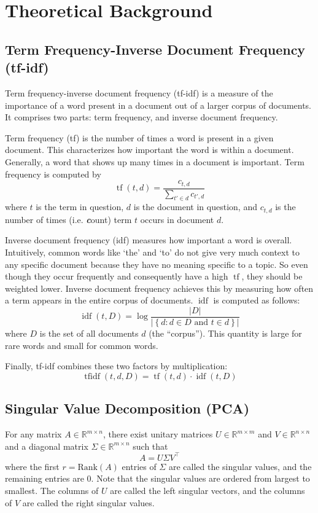 \documentclass[11pt]{amsart}
\newcommand{\reals}{\mathbb{R}}
\newcommand{\tr}{\top}
\DeclareMathOperator{\tf}{tf}
\DeclareMathOperator{\idf}{idf}
\DeclareMathOperator{\tfidf}{tfidf}
\begin{document}
\section{Theoretical Background}\label{sec:theory}

\subsection*{Term Frequency-Inverse Document Frequency (tf-idf)}

Term frequency-inverse document frequency (tf-idf) is a measure of the
importance of a word present in a document out of a larger corpus of documents.
It comprises two parts: term frequency, and inverse document frequency.

Term frequency (tf) is the
number of times a word is present in a given document. This characterizes how
important the word is within a document. Generally, a word that shows up many
times in a document is important. Term frequency is computed by
\[ \tf(t, d) = \frac{c_{t, d}}{\sum_{t' \in d} c_{t', d}}\]
where \(t\) is the
term in question, \(d\) is the document in question, and \(c_{t, d}\) is the
number of times (i.e. \emph{\textbf{c}}ount) term \(t\) occurs in document \(d\).

Inverse document frequency (idf) measures how important a word is overall.
Intuitively, common words like `the' and `to' do not give very much context to
any specific document because they have no meaning specific to a topic. So even
though they occur frequently and consequently have a high \(\tf\), they should
be weighted lower. Inverse document frequency achieves this by measuring how
often a term appears in the entire corpus of documents. \(\idf\) is computed as
follows:
\[ \idf(t, D) = \log \frac{|D|}{|\left\{ d : d \in D \text{ and } t \in
d\right\}|}\] where \(D\) is the set of all documents \(d\) (the ``corpus'').
This quantity is large for rare words and small for common words.

Finally, tf-idf combines these two factors by multiplication:
\[ \tfidf(t, d, D)  = \tf(t, d) \cdot \idf(t, D) \]

\subsection*{Singular Value Decomposition (PCA)}

For any matrix \(A \in \reals^{m\times n}\), there exist unitary matrices \(U
\in \reals^{m \times m}\)
and \(V \in \reals^{n \times n}\) and a diagonal matrix \(\Sigma \in \reals^{m
\times n}\) such that
\[ A = U \Sigma V^\tr \]
where the first \(r = \text{Rank}(A)\) entries of \(\Sigma\) are called the
singular values, and the remaining entries are 0. Note that the singular values
are ordered from largest to smallest. The columns of \(U\) are
called the left singular vectors, and the columns of \(V\) are called the right
singular values.
\end{document}
